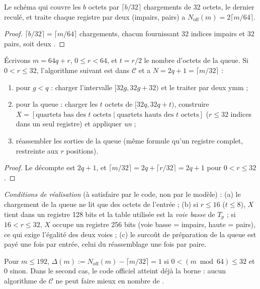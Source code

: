 \begin{proposition}\label{prop:off}
Le schéma qui couvre les $b$ octets par $\lceil b/32\rceil$ chargements de 32 octets, le dernier reculé, et traite chaque registre par deux \vpshufb{} (impairs, pairs) a $N_{\mathrm{off}}(m)=2\lceil m/64\rceil$.
\end{proposition}
\begin{proof}
$\lceil b/32\rceil=\lceil m/64\rceil$ chargements, chacun fournissant 32 indices impairs et 32 pairs, soit deux \vpshufb{}.
\end{proof}

\begin{proposition}\label{prop:real}
Écrivons $m=64q+r$, $0\le r<64$, et $t=r/2$ le nombre d'octets de la queue. Si $0<r\le32$, l'algorithme suivant est dans $\mathcal{C}$ et a $N=2q+1=\lceil m/32\rceil$ :
\begin{enumerate}[nosep]
\item pour $g<q$ : charger l'intervalle $[32g,32g+32)$ et le traiter par deux \vpshufb{} ymm ;
\item pour la queue : charger les $t$ octets de $[32q,32q+t)$, construire $X=[\text{quartets bas des }t\text{ octets}\mid\text{quartets hauts des }t\text{ octets}]$ ($r\le32$ indices dans un seul registre) et appliquer \emph{un} \vpshufb{} ;
\item réassembler les sorties de la queue (même formule qu'un registre complet, restreinte aux $r$ positions).
\end{enumerate}
\end{proposition}
\begin{proof}
Le décompte est $2q+1$, et $\lceil m/32\rceil=2q+\lceil r/32\rceil=2q+1$ pour $0<r\le32$.
\end{proof}
\emph{Conditions de réalisation} (à satisfaire par le code, non par le modèle) : (a) le chargement de la queue ne lit que des octets de l'entrée ; (b) si $r\le16$ ($t\le8$), $X$ tient dans un registre 128 bits et la table utilisée est la \emph{voie basse} de $T_p$ ; si $16<r\le32$, $X$ occupe un registre 256 bits (voie basse = impairs, haute = pairs), ce qui exige l'égalité des deux voies ; (c) le surcoût de préparation de la queue est payé une fois par entrée, celui du réassemblage une fois par paire.

\begin{corollaire}
Pour $m\le192$, $\Delta(m):=N_{\mathrm{off}}(m)-\lceil m/32\rceil=1$ si $0<(m\bmod64)\le32$ et $0$ sinon. Dans le second cas, le code officiel atteint déjà la borne : aucun algorithme de $\mathcal{C}$ ne peut faire mieux en nombre de \vpshufb{}.
\end{corollaire}

